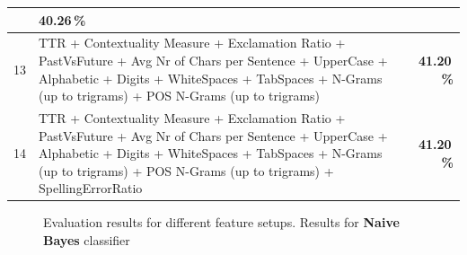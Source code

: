 \documentclass[journal, a4paper, 12pt]{IEEEtran}
\begin{document}
\begin{table}[!hbt]
\begin{center}
\begin{tabularx}{80mm}{| l | X | r |}
																& \textbf{40.26\,\%}		\\ \hline
			13		&	TTR + Contextuality Measure + Exclamation Ratio + PastVsFuture + Avg Nr of Chars per Sentence + UpperCase + Alphabetic + Digits + WhiteSpaces + TabSpaces + N-Grams (up to trigrams) + POS N-Grams (up to trigrams)
																& \textbf{41.20\,\%}		\\ \hline
			14		&	TTR + Contextuality Measure + Exclamation Ratio + PastVsFuture + Avg Nr of Chars per Sentence + UpperCase + Alphabetic + Digits + WhiteSpaces + TabSpaces + N-Grams (up to trigrams) + POS N-Grams (up to trigrams) + SpellingErrorRatio
																& \textbf{41.20\,\%}		\\ \hline
			\hline
		\end{tabularx}
	\end{center}
\end{table}

\begin{figure}[!hbt]
	\begin{center}
		\caption{Evaluation results for different feature setups. Results for \textbf{Naive Bayes} classifier}
		\label{fig:results-nb}
		\vspace{5mm}
	\end{center}
\end{figure}
\end{document}
